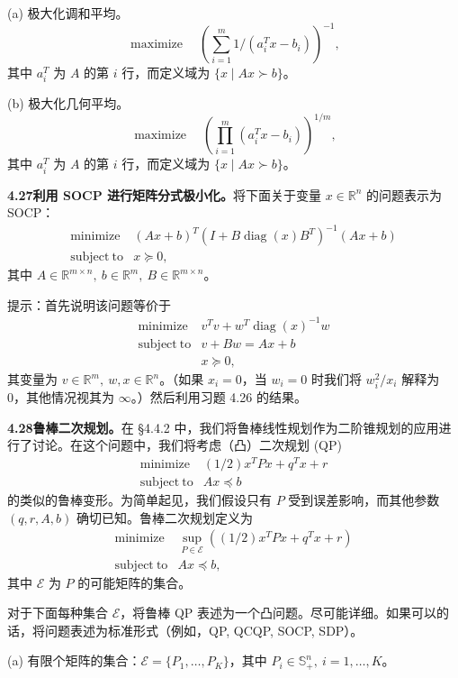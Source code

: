 \documentclass[UTF8, 12pt, fontset=fandol, oneside]{ctexart}
\begin{document}
(a) 极大化调和平均。
\[
\mathop{\mathrm{maximize}}\quad \left(\sum_{i=1}^m 1/(a_i^Tx-b_i)\right)^{-1},
\]
其中 $a_i^T$ 为 $A$ 的第 $i$ 行，而定义域为 $\{x\mid Ax\succ b\}$。

(b) 极大化几何平均。
\[
\mathop{\mathrm{maximize}}\quad \left(\prod_{i=1}^m(a_i^Tx-b_i)\right)^{1/m},
\]
其中 $a_i^T$ 为 $A$ 的第 $i$ 行，而定义域为 $\{x\mid Ax\succ b\}$。

\noindent\textbf{4.27\quad 利用 SOCP 进行矩阵分式极小化。}\quad 将下面关于变量 $x\in\mathbb{R}^n$ 的问题表示为 SOCP：
\[
\begin{array}{ll}
\mathop{\mathrm{minimize}} & (Ax+b)^T(I+B\operatorname{diag}(x)B^T)^{-1}(Ax+b)\\
\mathrm{subject\ to} & x\succeq0,
\end{array}
\]
其中 $A\in\mathbb{R}^{m\times n},\ b\in\mathbb{R}^m,\ B\in\mathbb{R}^{m\times n}$。

提示：首先说明该问题等价于
\[
\begin{array}{ll}
\mathop{\mathrm{minimize}} & v^Tv+w^T\operatorname{diag}(x)^{-1}w\\
\mathrm{subject\ to} & v+Bw=Ax+b\\
& x\succeq0,
\end{array}
\]
其变量为 $v\in\mathbb{R}^m,\ w,x\in\mathbb{R}^n$。（如果 $x_i=0$，当 $w_i=0$ 时我们将 $w_i^2/x_i$ 解释为 0，其他情况视其为 $\infty$。）然后利用习题 4.26 的结果。

\noindent\textbf{4.28\quad 鲁棒二次规划。}\quad 在 \S4.4.2 中，我们将鲁棒线性规划作为二阶锥规划的应用进行了讨论。在这个问题中，我们将考虑（凸）二次规划 (QP)
\[
\begin{array}{ll}
\mathop{\mathrm{minimize}} & (1/2)x^TPx+q^Tx+r\\
\mathrm{subject\ to} & Ax\preceq b
\end{array}
\]
的类似的鲁棒变形。为简单起见，我们假设只有 $P$ 受到误差影响，而其他参数 $(q,r,A,b)$ 确切已知。鲁棒二次规划定义为
\[
\begin{array}{ll}
\mathop{\mathrm{minimize}} & \sup_{P\in\mathcal{E}}\left((1/2)x^TPx+q^Tx+r\right)\\
\mathrm{subject\ to} & Ax\preceq b,
\end{array}
\]
其中 $\mathcal{E}$ 为 $P$ 的可能矩阵的集合。

对于下面每种集合 $\mathcal{E}$，将鲁棒 QP 表述为一个凸问题。尽可能详细。如果可以的话，将问题表述为标准形式（例如，QP, QCQP, SOCP, SDP）。

(a) 有限个矩阵的集合：$\mathcal{E}=\{P_1,\ldots,P_K\}$，其中 $P_i\in\mathbb{S}_+^n,\ i=1,\ldots,K$。
\end{document}
